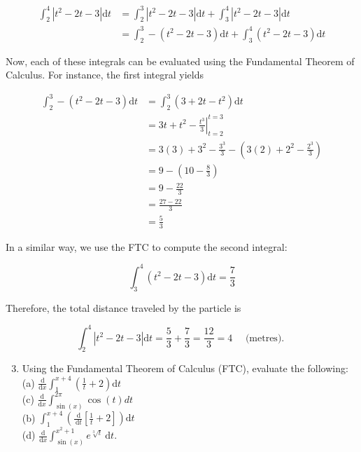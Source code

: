 \documentclass[10pt]{article}
\begin{document}
$$
\begin{aligned}
\int_{2}^{4}\left|t^{2}-2 t-3\right| \mathrm{d} t & =\int_{2}^{3}\left|t^{2}-2 t-3\right| \mathrm{d} t+\int_{3}^{4}\left|t^{2}-2 t-3\right| \mathrm{d} t \\
& =\int_{2}^{3}-\left(t^{2}-2 t-3\right) \mathrm{d} t+\int_{3}^{4}\left(t^{2}-2 t-3\right) \mathrm{d} t
\end{aligned}
$$

Now, each of these integrals can be evaluated using the Fundamental Theorem of Calculus. For instance, the first integral yields

$$
\begin{aligned}
\int_{2}^{3}-\left(t^{2}-2 t-3\right) \mathrm{d} t & =\int_{2}^{3}\left(3+2 t-t^{2}\right) \mathrm{d} t \\
& =3 t+t^{2}-\left.\frac{t^{3}}{3}\right|_{t=2} ^{t=3} \\
& =3(3)+3^{2}-\frac{3^{3}}{3}-\left(3(2)+2^{2}-\frac{2^{3}}{3}\right) \\
& =9-\left(10-\frac{8}{3}\right) \\
& =9-\frac{22}{3} \\
& =\frac{27-22}{3} \\
& =\frac{5}{3}
\end{aligned}
$$

In a similar way, we use the FTC to compute the second integral:

$$
\int_{3}^{4}\left(t^{2}-2 t-3\right) \mathrm{d} t=\frac{7}{3}
$$

Therefore, the total distance traveled by the particle is

$$
\int_{2}^{4}\left|t^{2}-2 t-3\right| \mathrm{d} t=\frac{5}{3}+\frac{7}{3}=\frac{12}{3}=4 \quad \text { (metres). }
$$

\begin{enumerate}
  \setcounter{enumi}{2}
  \item Using the Fundamental Theorem of Calculus (FTC), evaluate the following:\\
(a) $\frac{\mathrm{d}}{\mathrm{d} x} \int_{1}^{x+4}\left(\frac{1}{t}+2\right) \mathrm{d} t$\\
(c) $\frac{\mathrm{d}}{\mathrm{d} x} \int_{\sin (x)}^{2 \pi} \cos (t) d t$\\
(b) $\int_{1}^{x+4}\left(\frac{\mathrm{~d}}{\mathrm{~d} t}\left[\frac{1}{t}+2\right]\right) \mathrm{d} t$\\
(d) $\frac{\mathrm{d}}{\mathrm{d} x} \int_{\sin (x)}^{x^{2}+1} e^{\sqrt[3]{t}} \mathrm{~d} t$.
\end{enumerate}
\end{document}
